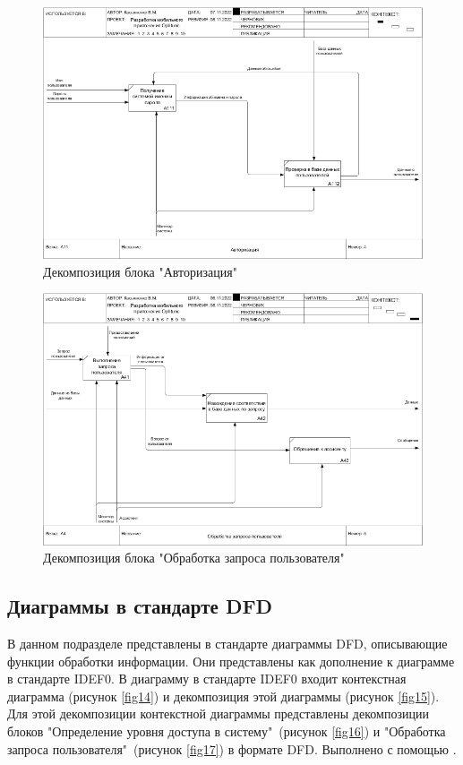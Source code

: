 \documentclass[14pt]{extreport}
\begin{document}
\begin{landscape}
\begin{figure}[H]
\centerline{\includegraphics[width=0.9\linewidth]{04_A11}}
\caption{Декомпозиция блока "Авторизация"}
\label{fig12}
\end{figure}

\begin{figure}[H]
\centerline{\includegraphics[width=0.9\linewidth]{05_A4}}
\caption{Декомпозиция блока "Обработка запроса пользователя"}
\label{fig13}
\end{figure}
\end{landscape}

\subsection{Диаграммы в стандарте DFD}

В данном подразделе представлены в стандарте диаграммы DFD, описывающие функции обработки информации. Они представлены как дополнение к диаграмме в стандарте IDEF0. В диаграмму в стандарте IDEF0 входит контекстная диаграмма  (рисунок \ref{fig14}) и декомпозиция этой диаграммы  (рисунок \ref{fig15}). Для этой декомпозиции контекстной диаграммы представлены  декомпозиции блоков "Определение уровня доступа в систему"\ (рисунок \ref{fig16}) и "Обработка запроса пользователя"\ (рисунок \ref{fig17}) в формате DFD. Выполнено с помощью \cite{bib5}.
\end{document}
